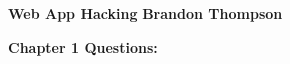 \noindent
\textbf{Web App Hacking} \hfill \textbf{Brandon Thompson} \\

\begin{center}
\textbf{Chapter 1 Questions:}
\end{center}